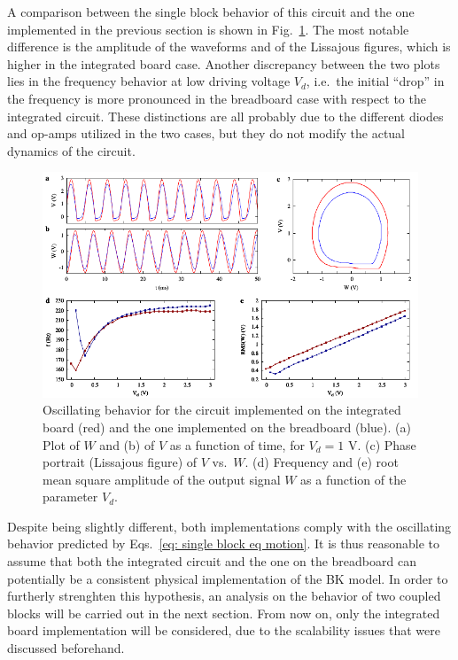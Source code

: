 A comparison between the single block behavior of this circuit and the one implemented in the previous section
is shown in Fig.~\ref{fig:oscillation board}. The most notable difference is the amplitude of the waveforms and of
the Lissajous figures, which is higher in the integrated board case. Another discrepancy between the two plots lies
in the frequency behavior at low driving voltage $V_d$, i.e.\ the initial ``drop'' in the frequency is more pronounced
in the breadboard case with respect to the integrated circuit. These distinctions are all probably due to the different diodes
and op-amps utilized in the two cases, but they do not modify the actual dynamics of the circuit.

\begin{figure}[!htbp]
    \centering
    \includegraphics[width=\linewidth]{../blocks/1_block/board_new/single_block.pdf}
    \caption{Oscillating behavior for the circuit implemented on
    the integrated board (red) and the one implemented on the breadboard (blue).
    (a) Plot of $W$ and (b) of $V$ as a function of time, for $V_d=1$ V.
    (c) Phase portrait (Lissajous figure) of $V$ vs.\ $W$. (d)
    Frequency and (e) root mean square amplitude of the
    output signal $W$ as a function of the parameter $V_d$.}\label{fig:oscillation board}
\end{figure}

Despite being slightly different, both implementations comply with the oscillating behavior predicted by
Eqs.~\ref{eq: single block eq motion}. It is thus reasonable to assume that both the integrated circuit and the one on the
breadboard can potentially be a consistent physical implementation of the BK model. In order to furtherly strenghten
this hypothesis, an analysis on the behavior of two coupled blocks will be carried out in the next section.
From now on, only the integrated board implementation will be considered, due to the scalability issues that were discussed
beforehand.


